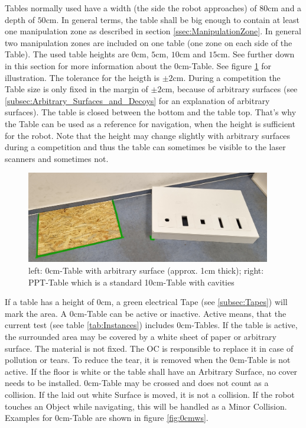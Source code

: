 Tables normally used have a width (the side the robot approaches) of $80\si{\centi\meter}$ and a depth of $50\si{\centi\meter}$. In general terms, the table shall be big enough to contain at least one manipulation zone as described in section \ref{ssec:ManipulationZone}. In general two manipulation zones are included on one table (one zone on each side of the Table). The used table heights are $0\si{\centi\meter}$, $5\si{\centi\meter}$, $10\si{\centi\meter}$ and $15\si{\centi\meter}$. See further down in this section for more information about the $0\si{\centi\meter}$-Table. See figure \ref{fig:ws} for illustration. 
The tolerance for the heigth is $\pm 2 \si{\centi\meter}$. During a competition the Table size is only fixed in the margin of $\pm 2 \si{\centi\meter}$, because of arbitrary surfaces (see \ref{subsec:Arbitrary_Surfaces_and_Decoys} for an explanation of arbitrary surfaces). 
The table is closed between the bottom and the table top. That's why the Table can be used as a reference for navigation, when the height is sufficient for the robot. Note that the height may change slightly with arbitrary surfaces during a competition and thus the table can sometimes be visible to the laser scanners and sometimes not. 
 
\begin{figure} [h!]
	\begin{center}
		\includegraphics[height = 4cm]{./images/arena/tables_small.jpg}	
	\end{center}
	\caption{left: 0\si{\centi\meter}-Table with arbitrary surface (approx. 1\si{\centi\meter} thick); right: PPT-Table which is a standard 10\si{\centi\meter}-Table with cavities}
	\label{fig:ws}
\end{figure}

If a table has a height of $0\si{\centi\meter}$, a green electrical Tape (see \ref{subsec:Tapes}) will mark the area. A $0\si{\centi\meter}$-Table can be active or inactive. Active means, that the current test (see table \ref{tab:Instances}) includes $0\si{\centi\meter}$-Tables.
If the table is active, the surrounded area may be covered by a white sheet of paper or arbitrary surface. The material is not fixed.
The OC is responsible to replace it in case of pollution or tears. To reduce the tear, it is removed when the $0\si{\centi\meter}$-Table is not active. If the floor is white or the table shall have an Arbitrary Surface, no cover needs to be installed.
$0\si{\centi\meter}$-Table may be crossed and does not count as a collision. If the laid out white Surface is moved, it is not a collision.
If the robot touches an Object while navigating, this will be handled as a Minor Collision. Examples for $0\si{\centi\meter}$-Table are shown in figure \ref{fig:0cmws}.



